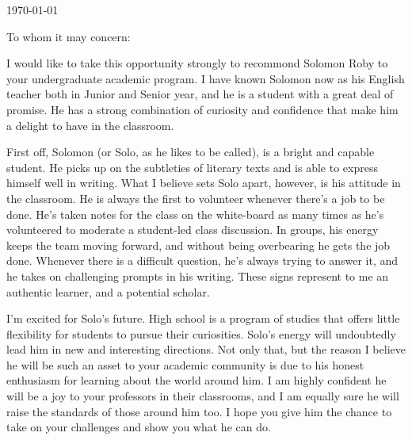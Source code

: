 \documentclass[11pt, letterpaper]{letter} %
\begin{document}

\begin{letter}{
	\today\\	
}


\opening{To whom it may concern:}

I would like to take this opportunity strongly to recommond Solomon Roby to your undergraduate academic program. I have known Solomon now as his English teacher both in Junior and Senior year, and he is a student with a great deal of promise. He has a strong combination of curiosity and confidence that make him a delight to have in the classroom.

		First off, Solomon (or Solo, as he likes to be called), is a bright and capable student. He picks up on the subtleties of literary texts and is able to express himself well in writing. What I believe sets Solo apart, however, is his attitude in the classroom. He is always the first to volunteer whenever there's a job to be done. He's taken notes for the class on the white-board as many times as he's volunteered to moderate a student-led class discussion. In groups, his energy keeps the team moving forward, and without being overbearing he gets the job done. Whenever there is a difficult question, he's always trying to answer it, and he takes on challenging prompts in his writing. These signs represent to me an authentic learner, and a potential scholar.

I'm excited for Solo's future. High school is a program of studies that offers little flexibility for students to pursue their curiosities. Solo's energy will undoubtedly lead him in new and interesting directions. Not only that, but the reason I believe he will be such an asset to your academic community is due to his honest enthusiasm for learning about the world around him. I am highly confident he will be a joy to your professors in their classrooms, and I am equally sure he will raise the standards of those around him too. I hope you give him the chance to take on your challenges and show you what he can do.


\end{letter}
\end{document}
